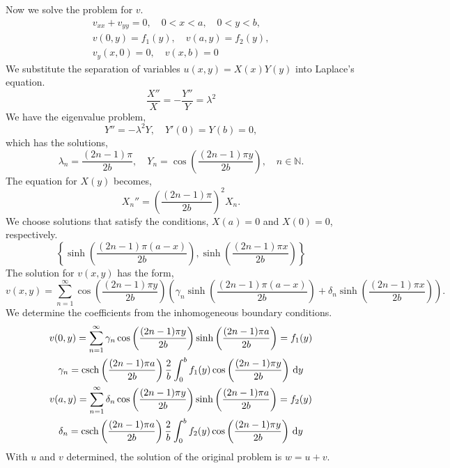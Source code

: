 {\begin{Solution}
Now we solve the problem for $v$.
\begin{gather*}
v_{x x} + v_{y y} = 0, \quad 0 < x < a, \quad 0 < y < b, \\
v(0, y) = f_1(y), \quad v(a, y) = f_2(y), \\
v_y(x, 0) = 0, \quad v(x, b) = 0
\end{gather*}
We substitute the separation of variables $u(x, y) = X(x) Y(y)$ into 
Laplace's equation.
\[
\frac{X''}{X} = - \frac{Y''}{Y} = \lambda^2
\]
We have the eigenvalue problem,
\[
Y'' = - \lambda^2 Y, \quad Y'(0) = Y(b) = 0,
\]
which has the solutions,
\[
\lambda_n = \frac{(2 n - 1)\pi}{2 b}, \quad 
        Y_n = \cos \left( \frac{(2 n - 1) \pi y}{2 b} \right),
        \quad n \in \mathbb{N}.
\]
The equation for $X(y)$ becomes,
\[
X_n'' = \left( \frac{(2 n - 1) \pi}{2 b} \right)^2 X_n.
\]
We choose solutions that satisfy the conditions, $X(a) = 0$ and $X(0) = 0$, 
respectively.
\[
\left\{
\sinh \left( \frac{(2 n - 1) \pi (a - x)}{2 b} \right),
\sinh \left( \frac{(2 n - 1) \pi x}{2 b} \right)
\right\}
\]
The solution for $v(x, y)$ has the form,
\[
v(x, y) = \sum_{n = 1}^\infty \cos \left( \frac{(2 n - 1) \pi y}{2 b} \right)
        \left( \gamma_n \sinh \left( \frac{(2 n - 1) \pi (a - x)}{2 b} \right)
        + \delta_n \sinh \left( \frac{(2 n - 1) \pi x}{2 b} \right) \right).
\]
We determine the coefficients from the inhomogeneous boundary conditions.
\begin{gather*}
v(0, y) = \sum_{n = 1}^\infty \gamma_n \cos \left( \frac{(2 n - 1) \pi y}{2 b} \right)
        \sinh \left( \frac{(2 n - 1) \pi a}{2 b} \right) = f_1(y) \\
\gamma_n = \mathop{\mathrm{csch}}\nolimits \left( \frac{(2 n - 1) \pi a}{2 b} \right) \frac{2}{b}
        \int_0^b f_1(y) \cos \left( \frac{(2 n - 1) \pi y}{2 b} \right)\,\mathrm{d} y\\
v(a, y) = \sum_{n = 1}^\infty \delta_n \cos \left( \frac{(2 n - 1) \pi y}{2 b} \right)
        \sinh \left( \frac{(2 n - 1) \pi a}{2 b} \right) = f_2(y) \\
\delta_n = \mathop{\mathrm{csch}}\nolimits \left( \frac{(2 n - 1) \pi a}{2 b} \right) \frac{2}{b}
        \int_0^b f_2(y) \cos \left( \frac{(2 n - 1) \pi y}{2 b} \right)\,\mathrm{d} y
\end{gather*}
With $u$ and $v$ determined, the solution of the original problem is 
$w = u + v$.
\end{Solution}













\raggedbottom
}
